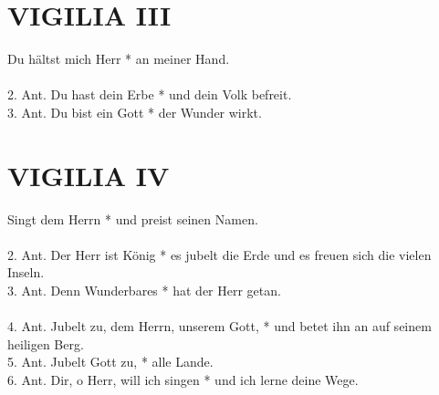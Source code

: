 \begin{flushleft}


\end{flushleft}

\section{VIGILIA III}

\begin{sloppypar}

{ Du hältst mich Herr * an meiner Hand.\\ \\
2. Ant. Du hast dein Erbe *  und dein Volk befreit. \\
3. Ant. Du bist ein Gott * der Wunder wirkt. \\}

\end{sloppypar}

\begin{flushleft}


\end{flushleft}


\section{VIGILIA IV}

\begin{sloppypar}

{ Singt dem Herrn * und preist seinen Namen. \\ \\
2. Ant. Der Herr ist König * es jubelt die Erde und es freuen sich die vielen Inseln. \\
3. Ant. Denn Wunderbares * hat der Herr getan.\\ \\
4. Ant. Jubelt zu,  dem Herrn, unserem Gott, * und betet ihn an auf seinem heiligen Berg. \\
5. Ant. Jubelt Gott zu, * alle Lande. \\
6. Ant.  Dir, o Herr, will ich singen * und ich lerne deine Wege. \\}

\end{sloppypar}

